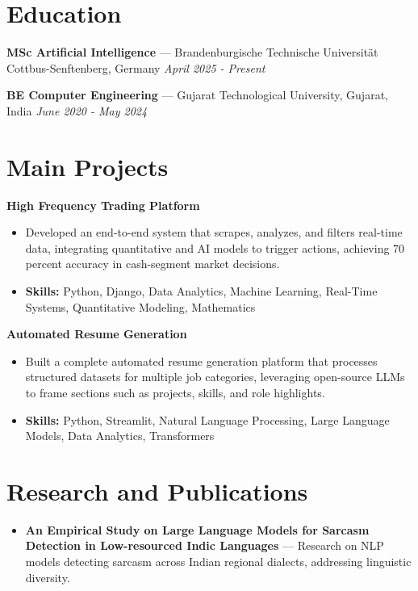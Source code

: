 \documentclass[a4paper,10pt]{article}
\begin{document}
\section*{Education}
\textbf{MSc Artificial Intelligence} — Brandenburgische Technische Universität Cottbus-Senftenberg, Germany \hfill \textit{April 2025 - Present}\par
\vspace{1.5pt}
\textbf{BE Computer Engineering} — Gujarat Technological University, Gujarat, India \hfill \textit{June 2020 - May 2024}\par

\section*{Main Projects}
\textbf{High Frequency Trading Platform}\par
\vspace{1pt}
\begin{itemize}
  \item Developed an end-to-end system that scrapes, analyzes, and filters real-time data, integrating quantitative and AI models to trigger actions, achieving 70 percent accuracy in cash-segment market decisions.
  \item \textbf{Skills:} Python, Django, Data Analytics, Machine Learning, Real-Time Systems, Quantitative Modeling, Mathematics
\end{itemize}
\vspace{3pt}
\textbf{Automated Resume Generation}\par
\vspace{1pt}
\begin{itemize}
  \item Built a complete automated resume generation platform that processes structured datasets for multiple job categories, leveraging open-source LLMs to frame sections such as projects, skills, and role highlights.
  \item \textbf{Skills:} Python, Streamlit, Natural Language Processing, Large Language Models, Data Analytics, Transformers
\end{itemize}

\section*{Research and Publications}
\begin{itemize}
\item \textbf{An Empirical Study on Large Language Models for Sarcasm Detection in Low-resourced Indic Languages} — Research on NLP models detecting sarcasm across Indian regional dialects, addressing linguistic diversity.
\end{itemize}
\end{document}
